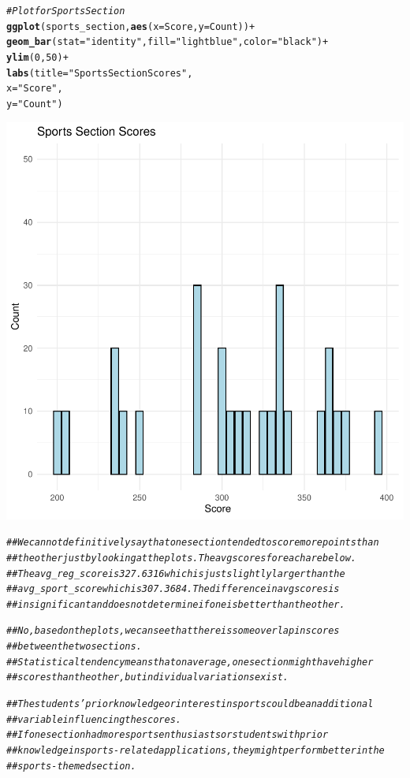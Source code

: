 \documentclass{article}\usepackage[]{graphicx}\usepackage[]{xcolor}
\makeatletter
\newcommand{\hlnum}[1]{\textcolor[rgb]{0.686,0.059,0.569}{#1}}%
\newcommand{\hlstr}[1]{\textcolor[rgb]{0.192,0.494,0.8}{#1}}%
\newcommand{\hlcom}[1]{\textcolor[rgb]{0.678,0.584,0.686}{\textit{#1}}}%
\newcommand{\hlopt}[1]{\textcolor[rgb]{0,0,0}{#1}}%
\newcommand{\hlstd}[1]{\textcolor[rgb]{0.345,0.345,0.345}{#1}}%
\newcommand{\hlkwc}[1]{\textcolor[rgb]{0.333,0.667,0.333}{#1}}%
\newcommand{\hlkwd}[1]{\textcolor[rgb]{0.737,0.353,0.396}{\textbf{#1}}}%
\newenvironment{kframe}{%
 \def\at@end@of@kframe{}%
 \ifinner\ifhmode%
  \def\at@end@of@kframe{\end{minipage}}%
  \begin{minipage}{\columnwidth}%
 \fi\fi%
 \def\FrameCommand##1{\hskip\@totalleftmargin \hskip-\fboxsep
 \colorbox{shadecolor}{##1}\hskip-\fboxsep
     \hskip-\linewidth \hskip-\@totalleftmargin \hskip\columnwidth}%
 \MakeFramed {\advance\hsize-\width
   \@totalleftmargin\z@ \linewidth\hsize
   \@setminipage}}%
 {\par\unskip\endMakeFramed%
 \at@end@of@kframe}
\newenvironment{knitrout}{}{} %
\makeatother
\begin{document}
\begin{knitrout}
\begin{kframe}\begin{alltt}
\hlcom{# Plot for Sports Section}
\hlkwd{ggplot}\hlstd{(sports_section,} \hlkwd{aes}\hlstd{(}\hlkwc{x} \hlstd{= Score,} \hlkwc{y} \hlstd{= Count))} \hlopt{+}
  \hlkwd{geom_bar}\hlstd{(}\hlkwc{stat} \hlstd{=}\hlstr{"identity"}\hlstd{,} \hlkwc{fill} \hlstd{=}\hlstr{"lightblue"}\hlstd{,} \hlkwc{color} \hlstd{=} \hlstr{"black"}\hlstd{)} \hlopt{+}
  \hlkwd{ylim}\hlstd{(}\hlnum{0}\hlstd{,}\hlnum{50}\hlstd{)}\hlopt{+}
  \hlkwd{labs}\hlstd{(}\hlkwc{title} \hlstd{=} \hlstr{"Sports Section Scores"}\hlstd{,}
       \hlkwc{x} \hlstd{=} \hlstr{"Score"}\hlstd{,}
       \hlkwc{y} \hlstd{=} \hlstr{"Count"}\hlstd{)}
\end{alltt}
\end{kframe}

{\centering \includegraphics[width=.6\linewidth]{figure/assignment-4-1-Reppeto-Brian-Rnwauto-report-2} 

}


\begin{kframe}\begin{alltt}
\hlcom{## We cannot definitively say that one section tended to score more points than }
\hlcom{## the other just by looking at the plots.  The avg scores for each are below.}
\hlcom{## The avg_reg_score is 327.6316 which is just slightly larger than the }
\hlcom{## avg_sport_score which is 307.3684.  The difference in avg scores is }
\hlcom{## insignificant and does not determine if one is better than the other.}


\hlcom{## No, based on the plots, we can see that there is some overlap in scores }
\hlcom{## between the two sections.  }
\hlcom{## Statistical tendency means that on average, one section might have higher }
\hlcom{## scores than the other, but individual variations exist.}


\hlcom{## The students' prior knowledge or interest in sports could be an additional }
\hlcom{## variable influencing the scores.}
\hlcom{## If one section had more sports enthusiasts or students with prior }
\hlcom{## knowledge in sports-related applications, they might perform better in the }
\hlcom{## sports-themed section.}
\end{alltt}
\end{kframe}
\end{knitrout}
\end{document}
